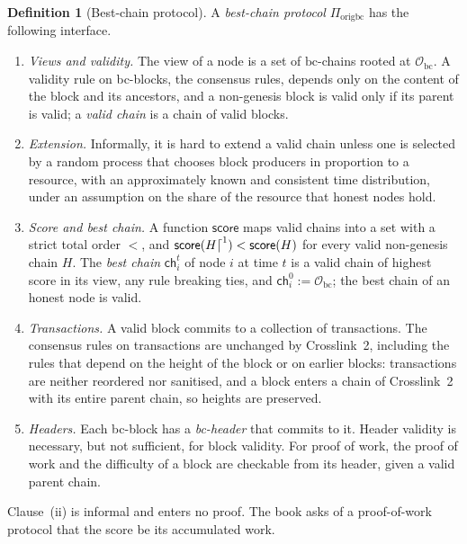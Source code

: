 \documentclass[11pt,a4paper]{article}
\theoremstyle{definition}
\newtheorem{definition}[theorem]{Definition}
\newcommand{\bc}{\mathrm{bc}}
\newcommand{\Origin}{\mathcal{O}}
\newcommand{\Obc}{\Origin_{\bc}}
\newcommand{\score}{\mathsf{score}}
\newcommand{\ch}{\mathsf{ch}}
\newcommand{\Piorigbc}{\Pi_{\mathrm{origbc}}}
\begin{document}
\begin{definition}[Best-chain protocol]\label{def:bc-protocol}
A \emph{best-chain protocol} $\Piorigbc$ has the following interface.
\begin{enumerate}[label=(\roman*)]
\item \emph{Views and validity.} The view of a node is a set of
  $\bc$-chains rooted at $\Obc$. A validity rule on bc-blocks, the consensus
  rules, depends only on the content of the block and its ancestors, and a
  non-genesis block is valid only if its parent is valid; a \emph{valid
  chain} is a chain of valid blocks.
\item \emph{Extension.} Informally, it is hard to extend a valid chain unless
  one is selected by a random process that chooses block producers in
  proportion to a resource, with an approximately known and consistent time
  distribution, under an assumption on the share of the resource that honest
  nodes hold.
\item \emph{Score and best chain.} A function $\score$ maps valid chains into
  a set with a strict total order $<$, and $\score(H\trunc{1}) < \score(H)$ for
  every valid non-genesis chain $H$.
  The \emph{best chain} $\ch_i^t$ of node $i$ at time $t$ is a valid chain of
  highest score in its view, any rule breaking ties, and
  $\ch_i^0 := \Obc$; the best chain of an honest node is valid.
\item \emph{Transactions.} A valid block commits to a collection of
  transactions. The consensus rules on transactions are unchanged by
  Crosslink~2, including the rules that depend on the height of the block or
  on earlier blocks: transactions are neither reordered nor sanitised, and a
  block enters a chain of Crosslink~2 with its entire parent chain, so
  heights are preserved.
\item \emph{Headers.} Each bc-block has a \emph{bc-header} that commits to
  it. Header validity is necessary, but not sufficient, for block validity.
  For proof of work, the proof of work and the difficulty of a block are
  checkable from its header, given a valid parent chain.
\end{enumerate}
\end{definition}

Clause~(ii) is informal and enters no proof. The book asks of a
proof-of-work protocol that the score be its accumulated work.
\end{document}
